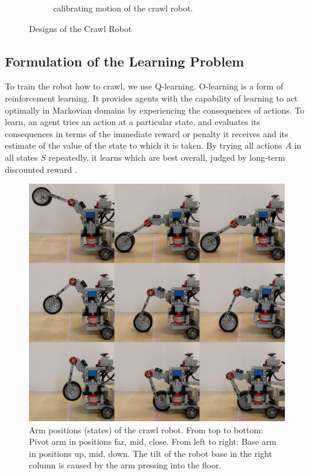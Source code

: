 \documentclass[11pt, a4paper]{article}
\begin{document}
\begin{figure}
\begin{subfigure}{.4\textwidth}
		\caption{calibrating motion of the crawl robot.}
		\label{fig:sub1}
	\end{subfigure}%
	\caption{Designs of the Crawl Robot}
	\label{fig:test}
\end{figure}

\subsection{Formulation of the Learning Problem}
To train the robot how to crawl, we use Q-learning. O-learning is a form of reinforcement learning. It provides agents with the capability of learning to act optimally in Markovian domains by experiencing the consequences of actions. To learn, an agent tries an action at a particular state, and evaluates its consequences in terms of the immediate reward or penalty it receives and its estimate of the value of the state to which it is taken. By trying all actions $A$ in all states $S$ repeatedly, it learns which are best overall, judged by long-term discounted reward \cite{Watkins1992}.

\begin{figure}
	\centering
	\includegraphics[width=0.6\linewidth]{images/crawl_states}
	\caption{Arm positions (states) of the crawl robot. From top to bottom: Pivot arm in positions far, mid, close. From left to right: Base arm in positions up, mid, down. The tilt of the robot base in the right column is caused by the arm pressing into the floor.}
	\label{fig:crawl_states}
\end{figure}
\end{document}
